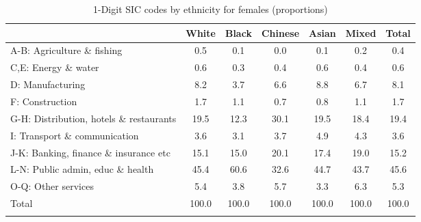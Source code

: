 \begin{table}[htbp]\centering
\def\sym#1{\ifmmode^{#1}\else\(^{#1}\)\fi}
\caption{1-Digit SIC codes by ethnicity for females (proportions)}
\begin{tabular}{l*{6}{c}}
\hline\hline
          &    White&    Black&  Chinese&    Asian&    Mixed&    Total\\
\hline
A-B: Agriculture \& fishing&      0.5&      0.1&      0.0&      0.1&      0.2&      0.4\\
C,E: Energy \& water&      0.6&      0.3&      0.4&      0.6&      0.4&      0.6\\
D: Manufacturing&      8.2&      3.7&      6.6&      8.8&      6.7&      8.1\\
F: Construction&      1.7&      1.1&      0.7&      0.8&      1.1&      1.7\\
G-H: Distribution, hotels \& restaurants&     19.5&     12.3&     30.1&     19.5&     18.4&     19.4\\
I: Transport \& communication&      3.6&      3.1&      3.7&      4.9&      4.3&      3.6\\
J-K: Banking, finance \& insurance etc&     15.1&     15.0&     20.1&     17.4&     19.0&     15.2\\
L-N: Public admin, educ \& health&     45.4&     60.6&     32.6&     44.7&     43.7&     45.6\\
O-Q: Other services&      5.4&      3.8&      5.7&      3.3&      6.3&      5.3\\
Total     &    100.0&    100.0&    100.0&    100.0&    100.0&    100.0\\
\hline\hline
\label{tab:1D_industries_female}
\end{tabular}
\end{table}
